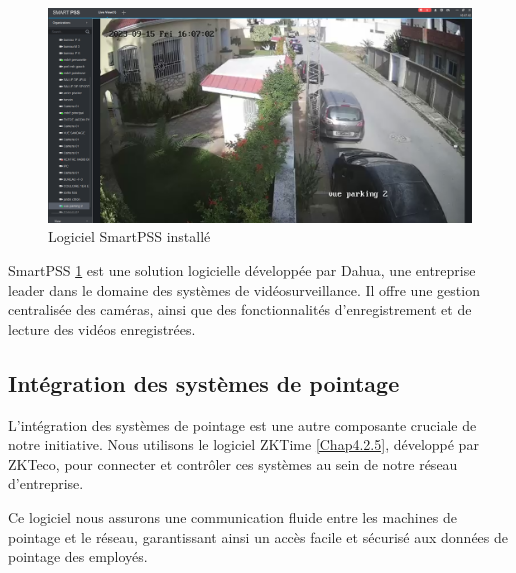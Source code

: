 \begin{figure}[H]
\centering
\includegraphics[width=15cm]{Images/SmartPSS1.png}
\caption{Logiciel SmartPSS installé}
\label{Chap4.2.4}
\end{figure}
\smallskip

SmartPSS \ref{Chap4.2.4} est une solution logicielle développée par Dahua, une entreprise leader dans le domaine des systèmes de vidéosurveillance. Il offre une gestion centralisée des caméras, ainsi que des fonctionnalités d'enregistrement et de lecture des vidéos enregistrées. 


\subsection{Intégration des systèmes de pointage}

L'intégration des systèmes de pointage est une autre composante cruciale de notre initiative. Nous utilisons le logiciel ZKTime \ref{Chap4.2.5}, développé par ZKTeco, pour connecter et contrôler ces systèmes au sein de notre réseau d'entreprise. 

Ce logiciel nous assurons une communication fluide entre les machines de pointage et le réseau, garantissant ainsi un accès facile et sécurisé aux données de pointage des employés.

